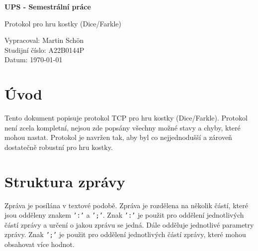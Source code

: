 \documentclass[12pt, a4paper]{article}
\begin{document}
\begin{titlepage}
    \begin{center}
        
        
        \vspace{2cm}
        
        \Huge
        \textbf{UPS - Semestrální práce}
        
        \vspace{1cm}
        
        \LARGE
        Protokol pro hru kostky (Dice/Farkle)
        
        \vfill
        
        \vspace{0.5cm}
        
        \normalsize
        \raggedright
        Vypracoval: Martin Schön \\
        Studijní číslo: A22B0144P \\
        Datum: \today
        \vspace{0.2cm}
        
    \end{center}
\end{titlepage}
\thispagestyle{empty}
\pagebreak

\renewcommand{\cftsecleader}{\cftdotfill{\cftdotsep}}
\renewcommand{\cftsubsecleader}{\cftdotfill{\cftdotsep}}
\renewcommand{\cftsubsubsecleader}{\cftdotfill{\cftdotsep}}

\setcounter{page}{2}
\tableofcontents
\pagebreak


\section{Úvod}
Tento dokument popisuje protokol TCP pro hru kostky (Dice/Farkle). 
Protokol není zcela kompletní, nejsou zde popsány všechny možné stavy a chyby, které mohou nastat.
Protokol je navržen tak, aby byl co nejjednodušší a zároveň dostatečně robustní pro hru kostky.


\section{Struktura zprávy}
Zpráva je posílána v textové podobě. 
Zpráva je rozdělena na několik částí, které jsou odděleny znakem \texttt{':'} a \texttt{';'}.
Znak \texttt{':'} je použit pro oddělení jednotlivých částí zprávy a určení o jakou zprávu se jedná.
Dále odděluje jednotlivé parametry zprávy.
Znak \texttt{';'} je použit pro oddělení jednotlivých částí zprávy, které mohou obsahovat více hodnot.
\end{document}
